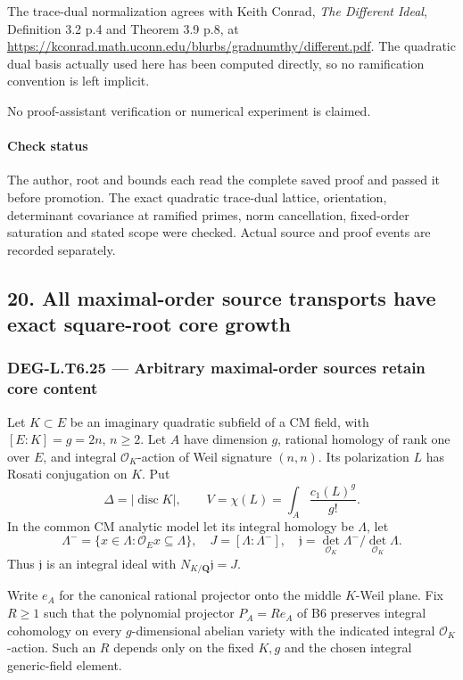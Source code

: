 The trace-dual normalization agrees with Keith Conrad, \emph{The Different Ideal}, Definition 3.2 p.4 and Theorem 3.9 p.8, at \url{https://kconrad.math.uconn.edu/blurbs/gradnumthy/different.pdf}. The quadratic dual basis actually used here has been computed directly, so no ramification convention is left implicit.

No proof-assistant verification or numerical experiment is claimed.

\paragraph{Check status}\label{check-status-4}

The author, root and bounds each read the complete saved proof and passed it before promotion. The exact quadratic trace-dual lattice, orientation, determinant covariance at ramified primes, norm cancellation, fixed-order saturation and stated scope were checked. Actual source and proof events are recorded separately.

\subsection{20. All maximal-order source transports have exact square-root core growth}\label{all-maximal-order-source-transports-have-exact-square-root-core-growth}

\subsubsection{DEG-L.T6.25 --- Arbitrary maximal-order sources retain core content}\label{DEG-L.T6.25}

Let \(K\subset E\) be an imaginary quadratic subfield of a CM field, with \([E:K]=g=2n\), \(n\ge2\). Let \(A\) have dimension \(g\), rational homology of rank one over \(E\), and integral \(\mathcal O_K\)-action of Weil signature \((n,n)\). Its polarization \(L\) has Rosati conjugation on \(K\). Put \[
 \Delta=|\operatorname{disc}K|,\qquad
 V=\chi(L)=\int_A\frac{c_1(L)^g}{g!}.
 \tag{T25.1}
\] In the common CM analytic model let its integral homology be \(\Lambda\), let \[
 \Lambda^-=\{x\in\Lambda:\mathcal O_E x\subseteq\Lambda\},\quad
 J=[\Lambda:\Lambda^-],\quad
 \mathfrak j=\det_{\mathcal O_K}\Lambda^-/
                        \det_{\mathcal O_K}\Lambda.
 \tag{T25.2}
\] Thus \(\mathfrak j\) is an integral ideal with \(N_{K/\mathbf Q}\mathfrak j=J\).

Write \(e_A\) for the canonical rational projector onto the middle \(K\)-Weil plane. Fix \(R\ge1\) such that the polynomial projector \(P_A=Re_A\) of B6 preserves integral cohomology on every \(g\)-dimensional abelian variety with the indicated integral \(\mathcal O_K\)-action. Such an \(R\) depends only on the fixed \(K,g\) and the chosen integral generic-field element.

